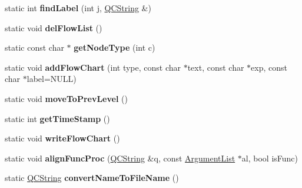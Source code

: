 \begin{DoxyCompactItemize}
\item 
\hypertarget{class_flow_chart_a9f3964d3c047588a2add731bdb21836b}{static int {\bfseries find\-Label} (int j, \hyperlink{class_q_c_string}{Q\-C\-String} \&)}\label{class_flow_chart_a9f3964d3c047588a2add731bdb21836b}

\item 
\hypertarget{class_flow_chart_a67e04d0555e2b1636177a690678a6475}{static void {\bfseries del\-Flow\-List} ()}\label{class_flow_chart_a67e04d0555e2b1636177a690678a6475}

\item 
\hypertarget{class_flow_chart_a54d7c658970da0de89bdf27b742bbfaf}{static const char $\ast$ {\bfseries get\-Node\-Type} (int c)}\label{class_flow_chart_a54d7c658970da0de89bdf27b742bbfaf}

\item 
\hypertarget{class_flow_chart_aecb6d5c965b6e53a761553fdc21a82ff}{static void {\bfseries add\-Flow\-Chart} (int type, const char $\ast$text, const char $\ast$exp, const char $\ast$label=N\-U\-L\-L)}\label{class_flow_chart_aecb6d5c965b6e53a761553fdc21a82ff}

\item 
\hypertarget{class_flow_chart_a8c2918861c2b19e1db8d38f45e05f302}{static void {\bfseries move\-To\-Prev\-Level} ()}\label{class_flow_chart_a8c2918861c2b19e1db8d38f45e05f302}

\item 
\hypertarget{class_flow_chart_a8478b0a1e74689fe3ce9103d53f36d66}{static int {\bfseries get\-Time\-Stamp} ()}\label{class_flow_chart_a8478b0a1e74689fe3ce9103d53f36d66}

\item 
\hypertarget{class_flow_chart_a7fee738dadd5f77768409e47641292cc}{static void {\bfseries write\-Flow\-Chart} ()}\label{class_flow_chart_a7fee738dadd5f77768409e47641292cc}

\item 
\hypertarget{class_flow_chart_a114de9f6639178cf5554f997e19d6e6c}{static void {\bfseries align\-Func\-Proc} (\hyperlink{class_q_c_string}{Q\-C\-String} \&q, const \hyperlink{class_argument_list}{Argument\-List} $\ast$al, bool is\-Func)}\label{class_flow_chart_a114de9f6639178cf5554f997e19d6e6c}

\item 
\hypertarget{class_flow_chart_a797b835cc99ae253de7a3c26d5308cfc}{static \hyperlink{class_q_c_string}{Q\-C\-String} {\bfseries convert\-Name\-To\-File\-Name} ()}\label{class_flow_chart_a797b835cc99ae253de7a3c26d5308cfc}


\end{DoxyCompactItemize}

